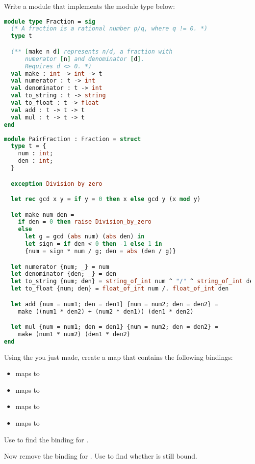 \problem[fraction]
Write a module that implements the  module type below:
\begin{lstlisting}[language=OCaml]
module type Fraction = sig
  (* A fraction is a rational number p/q, where q != 0. *)
  type t

  (** [make n d] represents n/d, a fraction with
      numerator [n] and denominator [d].
      Requires d <> 0. *)
  val make : int -> int -> t
  val numerator : t -> int
  val denominator : t -> int
  val to_string : t -> string
  val to_float : t -> float
  val add : t -> t -> t
  val mul : t -> t -> t
end
\end{lstlisting}

\begin{lstlisting}[language=OCaml]
module PairFraction : Fraction = struct
  type t = {
    num : int;
    den : int;
  }

  exception Division_by_zero

  let rec gcd x y = if y = 0 then x else gcd y (x mod y)

  let make num den =
    if den = 0 then raise Division_by_zero
    else
      let g = gcd (abs num) (abs den) in
      let sign = if den < 0 then -1 else 1 in
      {num = sign * num / g; den = abs (den / g)}

  let numerator {num; _} = num
  let denominator {den; _} = den
  let to_string {num; den} = string_of_int num ^ "/" ^ string_of_int den
  let to_float {num; den} = float_of_int num /. float_of_int den

  let add {num = num1; den = den1} {num = num2; den = den2} =
    make ((num1 * den2) + (num2 * den1)) (den1 * den2)

  let mul {num = num1; den = den1} {num = num2; den = den2} =
    make (num1 * num2) (den1 * den2)
end
\end{lstlisting}

Using the  you just made, create a map that contains the following bindings:
\begin{itemize}
  \item {} maps to 
  \item {} maps to 
  \item {} maps to 
  \item {} maps to 
\end{itemize}
Use  to find the binding for .

Now remove the binding for . Use  to find whether  is still bound.

